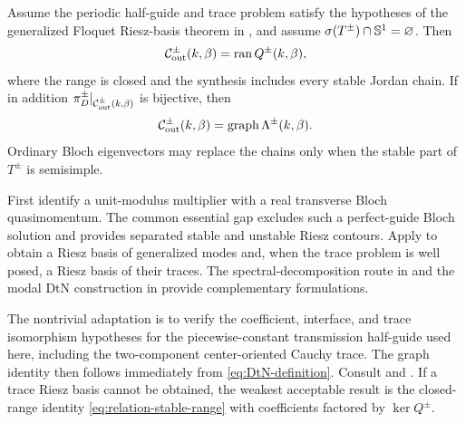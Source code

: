 \begin{proposition}
\label{prop:relation-Bloch}
Assume the periodic half-guide and trace problem satisfy the hypotheses of the
generalized Floquet Riesz-basis theorem in
\cite[Theorem~2.2]{HohageSoussi2013}, and assume
$\sigma(T^\pm)\cap\mathbb{S}^{1}=\varnothing$.  Then
\begin{equation}
  \mathcal C^\pm_{\mathrm{out}}(k,\beta)=\operatorname{ran} Q^\pm(k,\beta),
  \label{eq:relation-stable-range}
\end{equation}
where the range is closed and the synthesis includes every stable Jordan
chain.  If in addition $\pi_D^\pm|_{\mathcal{C}^{\pm}_{\mathrm{out}}(k,\beta)}$ is bijective, then
\begin{equation}
  \mathcal C^\pm_{\mathrm{out}}(k,\beta)
  =\operatorname{graph}\Lambda^\pm(k,\beta).
  \label{eq:relation-DtN-graph}
\end{equation}
Ordinary Bloch eigenvectors may replace the chains only when the stable part
of $T^\pm$ is semisimple.
\end{proposition}
\begin{proofroadmap}
First identify a unit-modulus multiplier with a real transverse Bloch
quasimomentum.  The common essential gap excludes such a perfect-guide Bloch
solution and provides separated stable and unstable Riesz contours.  Apply
\cite[Theorem~2.2 and Propositions~6.1--6.2]{HohageSoussi2013} to obtain a
Riesz basis of generalized modes and, when the trace problem is well posed, a
Riesz basis of their traces.  The spectral-decomposition route in
\cite[Sections~3--5]{Zhang2021} and the modal DtN construction in
\cite{Zhang2023} provide complementary formulations.

The nontrivial adaptation is to verify the coefficient, interface, and trace
isomorphism hypotheses for the piecewise-constant transmission half-guide used
here, including the two-component center-oriented Cauchy trace.  The graph
identity then follows immediately from \eqref{eq:DtN-definition}.  Consult
and .
If a trace Riesz basis cannot be obtained, the weakest acceptable result is
the closed-range identity \eqref{eq:relation-stable-range} with coefficients
factored by $\ker Q^\pm$.
\end{proofroadmap}
